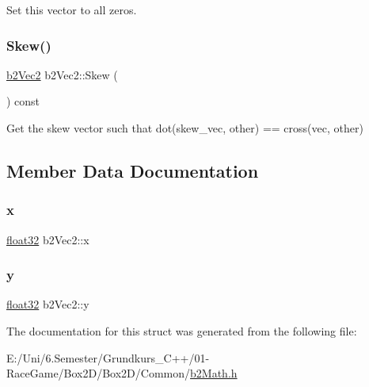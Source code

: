Set this vector to all zeros. 

\mbox{\label{structb2_vec2_aaf36e082a20368b24edb635511872a74}} 
\subsubsection{\texorpdfstring{Skew()}{Skew()}}
{\footnotesize\ttfamily \mbox{\hyperlink{structb2_vec2}{b2\+Vec2}} b2\+Vec2\+::\+Skew (\begin{DoxyParamCaption}{ }\end{DoxyParamCaption}) const\hspace{0.3cm}{\ttfamily [inline]}}



Get the skew vector such that dot(skew\+\_\+vec, other) == cross(vec, other) 



\subsection{Member Data Documentation}
\mbox{\label{structb2_vec2_a07021c1c08c547868e3cce9c9ef2ea71}} 
\subsubsection{\texorpdfstring{x}{x}}
{\footnotesize\ttfamily \mbox{\hyperlink{b2_settings_8h_aacdc525d6f7bddb3ae95d5c311bd06a1}{float32}} b2\+Vec2\+::x}

\mbox{\label{structb2_vec2_a880f573a9efe402ec207e9d132cb2a43}} 
\subsubsection{\texorpdfstring{y}{y}}
{\footnotesize\ttfamily \mbox{\hyperlink{b2_settings_8h_aacdc525d6f7bddb3ae95d5c311bd06a1}{float32}} b2\+Vec2\+::y}



The documentation for this struct was generated from the following file\+:\begin{DoxyCompactItemize}
\item 
E\+:/\+Uni/6.\+Semester/\+Grundkurs\+\_\+\+C++/01-\/\+Race\+Game/\+Box2\+D/\+Box2\+D/\+Common/\mbox{\hyperlink{b2_math_8h}{b2\+Math.\+h}}\end{DoxyCompactItemize}
